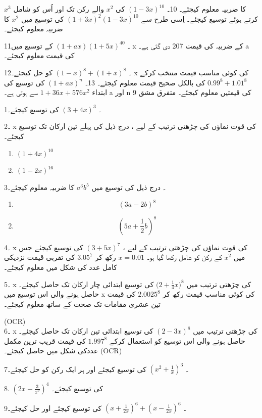  \( {x}^{3}\)
کا ضربیہ معلوم کیجئے۔ 
10۔
\( {(1-3x)^{10}}\)
کی
 \({x}^{2}\)
والے رکن تک اور اُس کو شامل کرتے ہوئے  توسیع کیجئے۔
  اِسی طرح سے 
 \({(1+3x)^{2}}{(1-3x)^{10}}\)
کی توسیع میں  
 \( {x}^{2}\)
کا ضربیہ معلوم کیجئے۔

11۔
\({(1+ax)}{(1+5x)^{40}}\)
کے توسیع میں x  کے ضربیہ کی قیمت 207 دی گئی ہے۔  a کی قیمت معلوم کیجئے۔

12۔
\( {(1-x)^{8}}+{(1+x)^{8}}\)
کو حل کیجئے۔  x  کی کوئی مناسب قیمت منتخب کرکے
\( {0.99}^{8}+{1.01}^{8}\)
 کی بالکل صحیح قیمت معلوم کیجئے۔ 
13۔  
\( {(1+ax)^{n}}\)
کی  توسیع کی ابتداء  
 \(1+36{x}+576{x}^{2}\)
سے ہوتی ہے۔ a   اور n   کی قیمتیں معلوم کیجئے۔ 
متفرق مشق  
9

1۔  
\({(3+4x)}^{3}\)  
کی توسیع کیجئے۔ 

2۔  x کی قوت نماؤں کی چڑھتی ترتیب کے لیے ، درج ذیل کی پہلے تین ارکان تک توسیع کیجئے۔ 
\begin{enumerate}
\item
\({(1+4x)}^{10} \)
\item
\( {(1-2x)}^{16}\)
\end{enumerate}
3۔  درج ذیل کی توسیع میں
\( {a}^{3}{b}^{5}\) 
کا ضربیہ معلوم کیجئے۔ 
\begin{enumerate}
\item
  \[{(3a-2b)}^{8}\]
  \item
  \[ (5a+\frac{1}{2}b)^{8}\]
  \end{enumerate}
4۔   x کی قوت نماؤں کی چڑھتی ترتیب کے لیے ،
\({(3+5x)}^{7}\)
کی توسیع کیجئے جس  میں 
 \( x^{2}\)
کے رکن کو شامل رکھا گیا ہو۔    
\(x=0.01\)
رکھ کر
\({3.05}^{7}\)  
کی تقربی قیمت نزدیکی کامل عدد کی شکل میں معلوم کیجئے۔ 

5۔ x  کی چڑھتی ترتیب میں
\({(2}+\frac{1}{4}{x)}^{8}\)
کی توسیع ابتدائی چار ارکان تک حاصل کیجئے۔ حاصل ہونے والی اس توسیع میں x  کی کوئی مناسب قیمت رکھ کر 
 \({2.0025}^{8}\)
کی قیمت تین عشری مقامات تک صحت کے ساتھ معلوم کیجئے۔ 

(OCR)\\
6۔ x  کی چڑھتی ترتیب میں
  \({(2-3x)}^{8}\)
کی توسیع ابتدائی تین ارکان تک حاصل کیجئے۔ حاصل ہونے والی اس توسیع کو استعمال کرکے 
  \( {1.997}^{8}\)
کی قیمت  قریب ترین مکمل عددکی شکل میں حاصل کیجئے۔  (OCR)

7۔ 
\( ({x}^{2}+\frac{1}{x})^{3}\)
کی توسیع کیجئے اور ہر ایک رکن کو حل کیجئے۔ 


  8.
  \(({2x}-\frac{3}{x^{2}})^{4}\)
کی توسیع کیجئے۔

9۔
\( ({x}+\frac{1}{2x})^{6}+({x}-\frac{1}{2x})^{6}\)
کی توسیع کیجئے اور حل کیجئے۔

